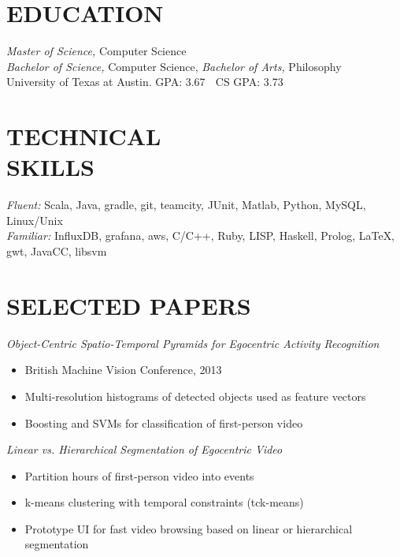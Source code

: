 \documentclass[line,margin]{res}
\begin{document}
\address{\textbf{email:} tomas.mccandless@gmail.com, \textbf{phone:} (210) 232-1477} 
\address{\textbf{github:} tomnis}
\begin{resume}
 
\section{EDUCATION} {\sl Master of Science,} Computer Science \\
                    {\sl Bachelor of Science,} Computer Science, {\sl Bachelor of Arts,} Philosophy \\
                University of Texas at Austin.  GPA: 3.67  $\;$ CS GPA: 3.73 
 
\section{TECHNICAL \\ SKILLS} {\sl Fluent:} Scala, Java, gradle, git, teamcity, JUnit, Matlab, Python, MySQL, Linux/Unix \\
                {\sl Familiar:} InfluxDB, grafana, aws, C/C++, Ruby, LISP, Haskell, Prolog, \LaTeX, gwt, JavaCC, libsvm


                              \section{SELECTED PAPERS} {\sl Object-Centric Spatio-Temporal Pyramids for Egocentric Activity Recognition}
	\begin{itemize} \itemsep -2pt
  \item British Machine Vision Conference, 2013
	\item Multi-resolution histograms of detected objects used as feature vectors
	\item Boosting and SVMs for classification of first-person video
	\end{itemize}


 {\sl Linear vs. Hierarchical Segmentation of Egocentric Video} 
	\begin{itemize} \itemsep -2pt
	\item Partition hours of first-person video into events 
	\item k-means clustering with temporal constraints (tck-means)
	\item Prototype UI for fast video browsing based on linear or hierarchical segmentation
	\end{itemize}


\end{resume}
\end{document}

